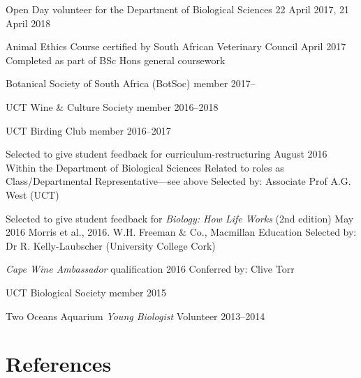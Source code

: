 \documentclass[10pt]{article}
\begin{document}
\begin{hangparas}{2em}{1}

Open Day volunteer for the Department of Biological Sciences
                                    \hfill {\small 22 April 2017, 21 April 2018}

Animal Ethics Course certified by South African Veterinary Council
                                                        \hfill April 2017 \break
Completed as part of BSc Hons general coursework

Botanical Society of South Africa (BotSoc) member         \hfill {\small 2017--}

UCT Wine \& Culture Society member                    \hfill {\small 2016--2018}

UCT Birding Club member                               \hfill {\small 2016--2017}

Selected to give student feedback for curriculum-restructuring
                                              \hfill {\small August 2016} \break
Within the Department of Biological Sciences \break
Related to roles as Class/Departmental Representative---see above \break
Selected by: Associate Prof A.G. West (UCT)

Selected to give student feedback for \textit{Biology: How Life Works} (2nd 
edition)                                         \hfill {\small May 2016} \break
Morris et al., 2016. W.H. Freeman \& Co., Macmillan Education \break
Selected by: Dr R. Kelly-Laubscher (University College Cork)

\textit{Cape Wine Ambassador} qualification          \hfill {\small 2016} \break
Conferred by: Clive Torr

UCT Biological Society member                               \hfill {\small 2015}

Two Oceans Aquarium \textit{Young Biologist} Volunteer \hfill {\small 2013--2014}

\hfill

\end{hangparas}

\hrulefill

\section*{References} %
\end{document}
